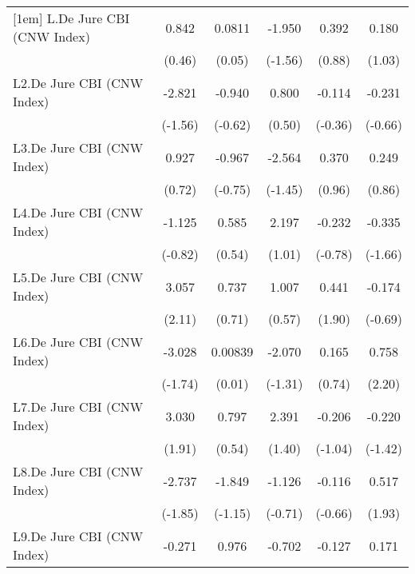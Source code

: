 {\begin{tabular}{l*{5}{c}}
[1em]
L.De Jure CBI (CNW Index)&    0.842         &   0.0811         &   -1.950         &    0.392         &    0.180         \\
                &   (0.46)         &   (0.05)         &  (-1.56)         &   (0.88)         &   (1.03)         \\
[1em]
L2.De Jure CBI (CNW Index)&   -2.821         &   -0.940         &    0.800         &   -0.114         &   -0.231         \\
                &  (-1.56)         &  (-0.62)         &   (0.50)         &  (-0.36)         &  (-0.66)         \\
[1em]
L3.De Jure CBI (CNW Index)&    0.927         &   -0.967         &   -2.564         &    0.370         &    0.249         \\
                &   (0.72)         &  (-0.75)         &  (-1.45)         &   (0.96)         &   (0.86)         \\
[1em]
L4.De Jure CBI (CNW Index)&   -1.125         &    0.585         &    2.197         &   -0.232         &   -0.335         \\
                &  (-0.82)         &   (0.54)         &   (1.01)         &  (-0.78)         &  (-1.66)         \\
[1em]
L5.De Jure CBI (CNW Index)&    3.057\sym{*}  &    0.737         &    1.007         &    0.441         &   -0.174         \\
                &   (2.11)         &   (0.71)         &   (0.57)         &   (1.90)         &  (-0.69)         \\
[1em]
L6.De Jure CBI (CNW Index)&   -3.028         &  0.00839         &   -2.070         &    0.165         &    0.758\sym{*}  \\
                &  (-1.74)         &   (0.01)         &  (-1.31)         &   (0.74)         &   (2.20)         \\
[1em]
L7.De Jure CBI (CNW Index)&    3.030         &    0.797         &    2.391         &   -0.206         &   -0.220         \\
                &   (1.91)         &   (0.54)         &   (1.40)         &  (-1.04)         &  (-1.42)         \\
[1em]
L8.De Jure CBI (CNW Index)&   -2.737         &   -1.849         &   -1.126         &   -0.116         &    0.517         \\
                &  (-1.85)         &  (-1.15)         &  (-0.71)         &  (-0.66)         &   (1.93)         \\
[1em]
L9.De Jure CBI (CNW Index)&   -0.271         &    0.976         &   -0.702         &   -0.127         &    0.171         \\

\end{tabular}}

